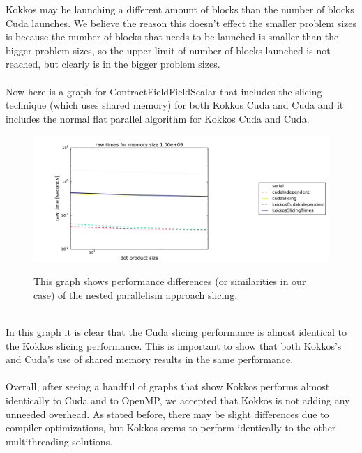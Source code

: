 Kokkos may be launching a different amount of blocks than the number of blocks Cuda launches.
We believe the reason this doesn't effect the smaller problem sizes is because
the number of blocks that needs to be launched is smaller than the bigger problem sizes, so
the upper limit of number of blocks launched is not reached, but clearly is in the bigger problem sizes. \\
\\
Now here is a graph for ContractFieldFieldScalar that includes the slicing technique (which uses shared memory)
for both Kokkos Cuda and Cuda and it includes the normal flat parallel algorithm for Kokkos Cuda and Cuda. \\
\begin{figure}[!ht]
{\includegraphics[scale=.4]{CFFS_RawTimes_2d_largest_Comparison.pdf}}
\caption[ContractFieldFieldScalar Kokkos performance comparison]{This graph shows performance differences (or similarities in our case)
of the nested parallelism approach slicing.}
\label{fig:cffscomparison}
\end{figure} \\
In this graph it is clear that the Cuda slicing performance is almost identical
to the Kokkos slicing performance. This is important to show that both Kokkos's
and Cuda's use of shared memory results in the same performance. \\
\\
Overall, after seeing a handful of graphs that show Kokkos performs almost
identically to Cuda and to OpenMP, we accepted that Kokkos is not adding any
unneeded overhead. As stated before, there may be slight differences due to
compiler optimizations, but Kokkos seems to perform identically to the other
multithreading solutions.

